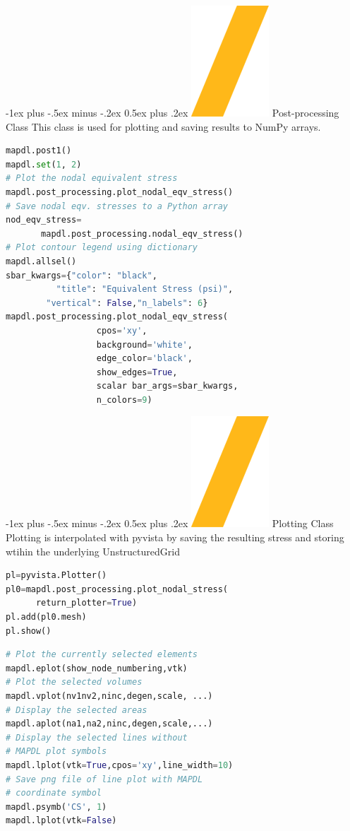 \documentclass[9pt,landscape]{article}
\makeatletter
\renewcommand{\section}{\@startsection{section}{1}{0mm}%
                                {-1ex plus -.5ex minus -.2ex}%
                                {0.5ex plus .2ex}%
                                {\normalfont\large\bfseries}}
\def\code#1{\texttt{#1}}
\makeatother
\begin{document}
\begin{multicols}{3}
\columnbreak

\section{\includegraphics[height=\fontcharht\font`\S]{slash.png} Post-processing Class}
This class is used for plotting and saving results to NumPy arrays.
\begin{lstlisting}[language=Python]
mapdl.post1()
mapdl.set(1, 2)
# Plot the nodal equivalent stress
mapdl.post_processing.plot_nodal_eqv_stress()
# Save nodal eqv. stresses to a Python array
nod_eqv_stress=
       mapdl.post_processing.nodal_eqv_stress()
# Plot contour legend using dictionary
mapdl.allsel()
sbar_kwargs={"color": "black",
          "title": "Equivalent Stress (psi)",
        "vertical": False,"n_labels": 6}
mapdl.post_processing.plot_nodal_eqv_stress(
                  cpos='xy',
                  background='white',
                  edge_color='black',
                  show_edges=True,
                  scalar bar_args=sbar_kwargs,
                  n_colors=9)
\end{lstlisting} 
\vfill
\section{\includegraphics[height=\fontcharht\font`\S]{slash.png} Plotting Class}
Plotting is interpolated with pyvista by saving the resulting stress and storing wtihin the underlying UnstructuredGrid
\begin{lstlisting}[language=Python]
pl=pyvista.Plotter()
pl0=mapdl.post_processing.plot_nodal_stress(
      return_plotter=True)
pl.add(pl0.mesh)
pl.show()
\end{lstlisting} 
\begin{lstlisting}[language=Python]
# Plot the currently selected elements
mapdl.eplot(show_node_numbering,vtk)
# Plot the selected volumes
mapdl.vplot(nv1nv2,ninc,degen,scale, ...)
# Display the selected areas
mapdl.aplot(na1,na2,ninc,degen,scale,...)
# Display the selected lines without 
# MAPDL plot symbols
mapdl.lplot(vtk=True,cpos='xy',line_width=10)
# Save png file of line plot with MAPDL 
# coordinate symbol
mapdl.psymb('CS', 1)
mapdl.lplot(vtk=False)
\end{lstlisting} 
\vfill


\end{multicols}
\end{document}

